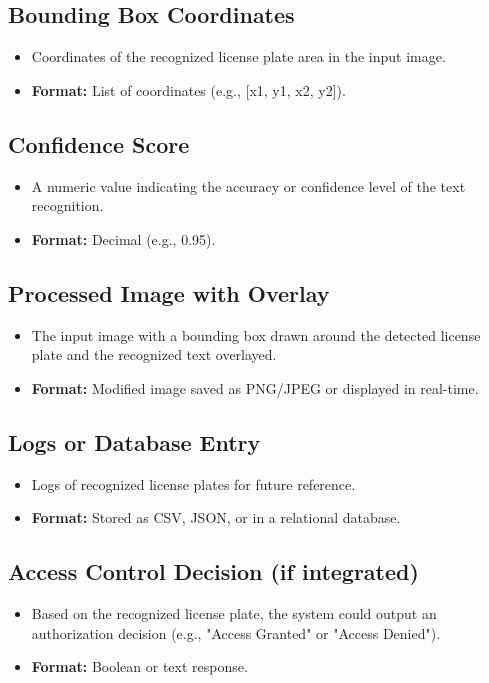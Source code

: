 \subsection*{Bounding Box Coordinates}
\begin{itemize}
	\item Coordinates of the recognized license plate area in the input image.
	\item \textbf{Format:} List of coordinates (e.g., [x1, y1, x2, y2]).
\end{itemize}

\subsection*{Confidence Score}
\begin{itemize}
	\item A numeric value indicating the accuracy or confidence level of the text recognition.
	\item \textbf{Format:} Decimal (e.g., 0.95).
\end{itemize}

\subsection*{Processed Image with Overlay}
\begin{itemize}
	\item The input image with a bounding box drawn around the detected license plate and the recognized text overlayed.
	\item \textbf{Format:} Modified image saved as PNG/JPEG or displayed in real-time.
\end{itemize}

\subsection*{Logs or Database Entry}
\begin{itemize}
	\item Logs of recognized license plates for future reference.
	\item \textbf{Format:} Stored as CSV, JSON, or in a relational database.
\end{itemize}

\subsection*{Access Control Decision (if integrated)}
\begin{itemize}
	\item Based on the recognized license plate, the system could output an authorization decision (e.g., "Access Granted" or "Access Denied").
	\item \textbf{Format:} Boolean or text response.
\end{itemize}

